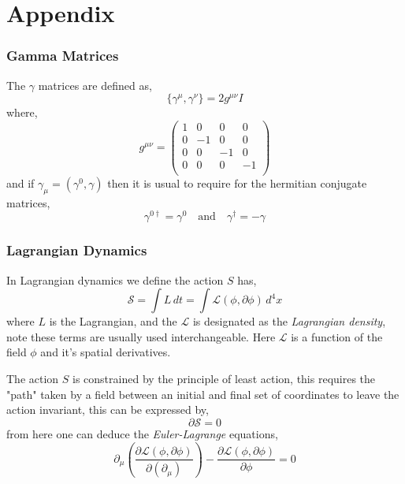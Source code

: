 
\newpage 

\chapter{Appendix}

\subsection{Gamma Matrices}
The $\gamma$ matrices are defined as, 
\begin{equation}
\{  \gamma^\mu , \gamma^\nu \} = 2 g^{\mu \nu} I 
\end{equation}
where, 
\begin{equation}
g^{ \mu \nu } = 
\begin{pmatrix}
1 & 0 & 0 & 0 \\
0 & -1 & 0 & 0  \\
0 & 0 & -1 & 0 \\
0 & 0 & 0 & -1 \\
\end{pmatrix}
\end{equation}
and if $\gamma_\mu = (\gamma^0, \gamma)$  then it is usual to require for the hermitian conjugate matrices,
\begin{equation}
\gamma^{0 \dagger} = \gamma^0 \quad \textrm{and} \quad \gamma^\dagger = - \gamma 
\end{equation}


\subsection{Lagrangian Dynamics}

In Lagrangian dynamics we define the action $S$ has, 
\begin{equation}
\mathcal{S} = \int L \, dt = \int \mathcal{L}(\phi,\partial \phi ) \, d^4x  
\end{equation}
where $L$ is the Lagrangian, and the $\mathcal{L}$ is designated as the \textit{Lagrangian density}, note these terms are
usually used interchangeable. Here $\mathcal{L}$ is a function of the field $\phi$ and it's spatial derivatives. 

The action $S$ is constrained by the principle of least action, this requires the "path" taken by a field between an initial and final set
of coordinates to leave the action invariant, this can be expressed by,
\begin{equation}
\partial \mathcal{S} = 0 
\end{equation}
from here one can deduce the \textit{Euler-Lagrange} equations,
\begin{equation}
\partial_\mu \left( \frac{\partial \mathcal{L}(\phi,\partial \phi ) }{ \partial (\partial_\mu) } \right) - \frac{ \partial \mathcal{L}(\phi,\partial \phi ) }{ \partial \phi }  = 0 
\end{equation} 